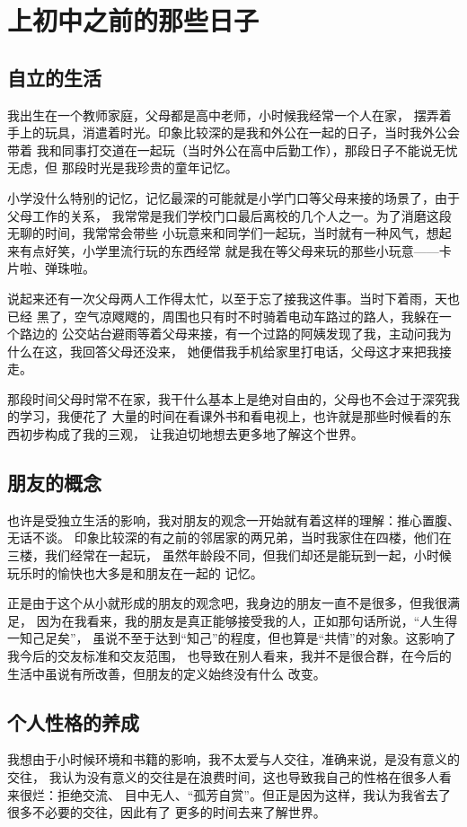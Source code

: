 \documentclass[AutoFakeBold]{LZUThesis}
\begin{document}
\section{上初中之前的那些日子}

\subsection{自立的生活}

我出生在一个教师家庭，父母都是高中老师，小时候我经常一个人在家，
摆弄着手上的玩具，消遣着时光。印象比较深的是我和外公在一起的日子，当时我外公会带着
我和同事打交道在一起玩（当时外公在高中后勤工作），那段日子不能说无忧无虑，但
那段时光是我珍贵的童年记忆。

小学没什么特别的记忆，记忆最深的可能就是小学门口等父母来接的场景了，由于父母工作的关系，
我常常是我们学校门口最后离校的几个人之一。为了消磨这段无聊的时间，我常常会带些
小玩意来和同学们一起玩，当时就有一种风气，想起来有点好笑，小学里流行玩的东西经常
就是我在等父母来玩的那些小玩意——卡片啦、弹珠啦。

说起来还有一次父母两人工作得太忙，以至于忘了接我这件事。当时下着雨，天也已经
黑了，空气凉飕飕的，周围也只有时不时骑着电动车路过的路人，我躲在一个路边的
公交站台避雨等着父母来接，有一个过路的阿姨发现了我，主动问我为什么在这，我回答父母还没来，
她便借我手机给家里打电话，父母这才来把我接走。

那段时间父母时常不在家，我干什么基本上是绝对自由的，父母也不会过于深究我的学习，我便花了
大量的时间在看课外书和看电视上，也许就是那些时候看的东西初步构成了我的三观，
让我迫切地想去更多地了解这个世界。

\subsection{朋友的概念}
也许是受独立生活的影响，我对朋友的观念一开始就有着这样的理解：推心置腹、无话不谈。
印象比较深的有之前的邻居家的两兄弟，当时我家住在四楼，他们在三楼，我们经常在一起玩，
虽然年龄段不同，但我们却还是能玩到一起，小时候玩乐时的愉快也大多是和朋友在一起的
记忆。

正是由于这个从小就形成的朋友的观念吧，我身边的朋友一直不是很多，但我很满足，
因为在我看来，我的朋友是真正能够接受我的人，正如那句话所说，“人生得一知己足矣”，
虽说不至于达到“知己”的程度，但也算是“共情”的对象。这影响了我今后的交友标准和交友范围，
也导致在别人看来，我并不是很合群，在今后的生活中虽说有所改善，但朋友的定义始终没有什么
改变。

\subsection{个人性格的养成}
我想由于小时候环境和书籍的影响，我不太爱与人交往，准确来说，是没有意义的交往，
我认为没有意义的交往是在浪费时间，这也导致我自己的性格在很多人看来很烂：拒绝交流、
目中无人、“孤芳自赏”。但正是因为这样，我认为我省去了很多不必要的交往，因此有了
更多的时间去来了解世界。
\end{document}
